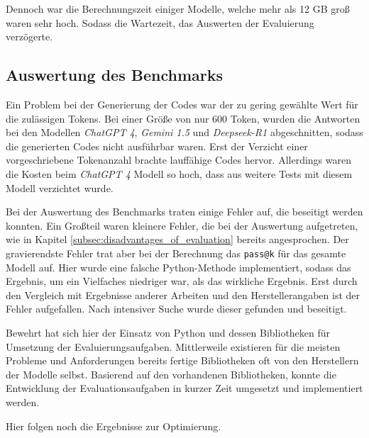 Dennoch war die Berechnungszeit einiger Modelle, welche mehr als 12 GB groß waren sehr hoch. Sodass die Wartezeit, das Auswerten der Evaluierung verzögerte.


\subsection{Auswertung des Benchmarks}
Ein Problem bei der Generierung der Codes war der zu gering gewählte Wert für die zulässigen Tokens. Bei einer Größe von nur 600 Token, wurden die Antworten bei den Modellen \textit{ChatGPT 4}, \textit{Gemini 1.5} und \textit{Deepseek-R1} abgeschnitten, sodass die generierten Codes nicht ausführbar waren. Erst der Verzicht einer vorgeschriebene Tokenanzahl brachte lauffähige Codes hervor. Allerdings waren die Kosten beim \textit{ChatGPT 4} Modell so hoch, dass aus weitere Tests mit diesem Modell verzichtet wurde.\vspace{0.2cm}

Bei der Auswertung des Benchmarks traten einige Fehler auf, die beseitigt werden konnten. Ein Großteil waren kleinere Fehler, die bei der Auswertung aufgetreten, wie in Kapitel \ref{subsec:disadvantages_of_evaluation} bereits angesprochen. Der gravierendste Fehler trat aber bei der Berechnung das \texttt{pass@k} für das gesamte Modell auf. Hier wurde eine falsche Python-Methode implementiert, sodass das Ergebnis, um ein Vielfaches niedriger war, als das wirkliche Ergebnis. Erst durch den Vergleich mit Ergebnisse anderer Arbeiten und den Herstellerangaben ist der Fehler aufgefallen. Nach intensiver Suche wurde dieser gefunden und beseitigt.\vspace{0.2cm}

Bewehrt hat sich hier der Einsatz von Python und dessen Bibliotheken für Umsetzung der Evaluierungsaufgaben. Mittlerweile existieren für die meisten Probleme und Anforderungen bereits fertige Bibliotheken oft von den Herstellern der Modelle selbst. Basierend auf den vorhandenen Bibliotheken, konnte die Entwicklung der Evaluationsaufgaben in kurzer Zeit umgesetzt und implementiert werden.\vspace{0.2cm}


\begin{tcolorbox}[
	enhanced,
	colback=red!5!white,
	colframe=red!75!black!50,
	title= Mein roter Faden
	]
	Hier folgen noch die Ergebnisse zur Optimierung.
\end{tcolorbox}

